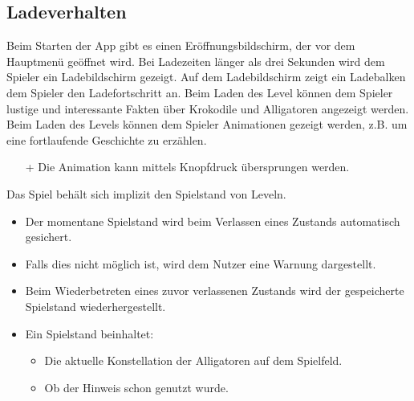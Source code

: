 \subsection{Ladeverhalten}
\begin {requirements}
	 Beim Starten der App gibt es einen Eröffnungsbildschirm, der vor dem Hauptmenü geöffnet wird.
	 Bei Ladezeiten länger als drei Sekunden wird dem Spieler ein Ladebildschirm gezeigt.
	 Auf dem Ladebildschirm zeigt ein Ladebalken dem Spieler den Ladefortschritt an.
	 Beim Laden des Level können dem Spieler lustige und interessante Fakten über Krokodile und Alligatoren angezeigt werden.
	 Beim Laden des Levels können dem Spieler Animationen gezeigt werden, z.B. um eine fortlaufende Geschichte zu erzählen.
	\begin{itemize}
		\item[+] Die Animation kann mittels Knopfdruck übersprungen werden.
	\end{itemize}
	 Das Spiel behält sich implizit den Spielstand von Leveln.
	\begin{itemize}
		\item Der momentane Spielstand wird beim Verlassen eines Zustands automatisch gesichert.
		\item Falls dies nicht möglich ist, wird dem Nutzer eine Warnung dargestellt.
		\item Beim Wiederbetreten eines zuvor verlassenen Zustands wird  der gespeicherte Spielstand wiederhergestellt.
		\item Ein Spielstand beinhaltet:
		\begin{itemize}
			\item Die aktuelle Konstellation der Alligatoren auf dem Spielfeld.
			\item Ob der Hinweis schon genutzt wurde.
		\end{itemize}
	\end{itemize}

\end {requirements}
